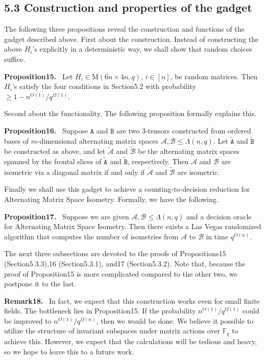 \documentclass[10pt,a4paper]{article}
\newenvironment{authorclaim}[1]{\par\medskip\noindent\textbf{#1.}\ }{\par\medskip}
\begin{document}
\subsection*{5.3 Construction and properties of the gadget}
The following three propositions reveal the construction and functions of the gadget described above. First about the construction. Instead of constructing the above $H_i$'s explicitly in a deterministic way, we shall show that random choices suffice.
\begin{authorclaim}{Proposition15}
Let $H_i\in\mathrm M(6n\times4n,q)$, $i\in[n]$, be random matrices. Then $H_i$'s satisfy the four conditions in Section5.2 with probability $\ge1-n^{O(1)}/q^{\Omega(1)}$.
\end{authorclaim}
Second about the functionality. The following proposition formally explains this.
\begin{authorclaim}{Proposition16}
Suppose $\mathtt A$ and $\mathtt B$ are two 3-tensors constructed from ordered bases of $m$-dimensional alternating matrix spaces $\mathcal A,\mathcal B\le\Lambda(n,q)$. Let $\widetilde{\mathtt A}$ and $\widetilde{\mathtt B}$ be constructed as above, and let $\widetilde{\mathcal A}$ and $\widetilde{\mathcal B}$ be the alternating matrix spaces spanned by the frontal slices of $\widetilde{\mathtt A}$ and $\widetilde{\mathtt B}$, respectively. Then $\mathcal A$ and $\mathcal B$ are isometric via a diagonal matrix if and only if $\widetilde{\mathcal A}$ and $\widetilde{\mathcal B}$ are isometric.
\end{authorclaim}
Finally we shall use this gadget to achieve a counting-to-decision reduction for Alternating Matrix Space Isometry. Formally, we have the following.
\begin{authorclaim}{Proposition17}
Suppose we are given $\mathcal A,\mathcal B\le\Lambda(n,q)$ and a decision oracle for Alternating Matrix Space Isometry. Then there exists a Las Vegas randomized algorithm that computes the number of isometries from $\mathcal A$ to $\mathcal B$ in time $q^{O(n)}$.
\end{authorclaim}
The next three subsections are devoted to the proofs of Propositions15 (Section5.3.3),16 (Section5.3.1), and17 (Section5.3.2). Note that, because the proof of Proposition15 is more complicated compared to the other two, we postpone it to the last.
\begin{authorclaim}{Remark18}
In fact, we expect that this construction works even for small finite fields. The bottleneck lies in Proposition15. If the probability $n^{O(1)}/q^{\Omega(1)}$ could be improved to $n^{O(1)}/q^{\Omega(n)}$, then we would be done. We believe it possible to utilize the structure of invariant subspaces under matrix actions over $\mathbb F_q$ to achieve this. However, we expect that the calculations will be tedious and heavy, so we hope to leave this to a future work.
\end{authorclaim}
\end{document}
